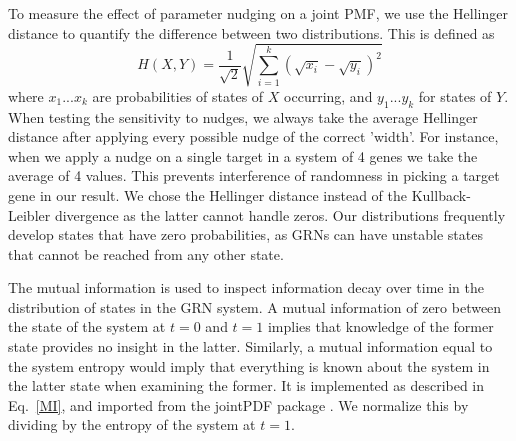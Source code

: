 \documentclass[../main.tex]{subfiles}
\begin{document}
To measure the effect of parameter nudging on a joint PMF, we use the Hellinger distance to quantify the difference between two distributions.
This is defined as
%
\begin{equation}
H(X, Y) = \frac{1}{\sqrt{2}} \sqrt{\sum^k_{i=1} (\sqrt{x_i} - \sqrt{y_i})^2}
\end{equation}
%
where ${x_1 ... x_k}$ are probabilities of states of $X$ occurring, and ${y_1 ... y_k}$ for states of $Y$.
When testing the sensitivity to nudges, we always take the average Hellinger distance after applying every possible nudge of the correct 'width'.
For instance, when we apply a nudge on a single target in a system of 4 genes we take the average of 4 values.
This prevents interference of randomness in picking a target gene in our result.
We chose the Hellinger distance instead of the Kullback-Leibler divergence as the latter cannot handle zeros.
Our distributions frequently develop states that have zero probabilities, as GRNs can have unstable states that cannot be reached from any other state.

The mutual information is used to inspect information decay over time in the distribution of states in the GRN system. %
A mutual information of zero between the state of the system at $t=0$ and $t=1$ implies that knowledge of the former state provides no insight in the latter.
Similarly, a mutual information equal to the system entropy would imply that everything is known about the system in the latter state when examining the former.
It is implemented as described in Eq.~\ref{MI}, and imported from the jointPDF package \cite{jointpdf}.
We normalize this by dividing by the entropy of the system at $t = 1$. %
\end{document}
